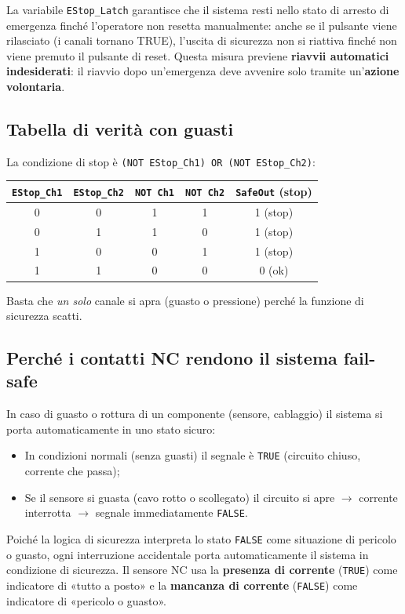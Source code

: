 La variabile \texttt{EStop\_Latch} garantisce che il sistema resti nello stato di arresto di emergenza finché l'operatore non resetta manualmente: anche se il pulsante viene rilasciato (i canali tornano TRUE), l'uscita di sicurezza non si riattiva finché non viene premuto il pulsante di reset. Questa misura previene \textbf{riavvii automatici indesiderati}: il riavvio dopo un'emergenza deve avvenire solo tramite un'\textbf{azione volontaria}.

\subsection{Tabella di verità con guasti}
La condizione di stop è \texttt{(NOT EStop\_Ch1) OR (NOT EStop\_Ch2)}:
\begin{center}
\begin{tabular}{cc|cc|c}
\texttt{EStop\_Ch1} & \texttt{EStop\_Ch2} & \texttt{NOT Ch1} & \texttt{NOT Ch2} & \texttt{SafeOut} (stop)\\
\hline
0 & 0 & 1 & 1 & 1 (stop)\\
0 & 1 & 1 & 0 & 1 (stop)\\
1 & 0 & 0 & 1 & 1 (stop)\\
1 & 1 & 0 & 0 & 0 (ok)\\
\end{tabular}
\end{center}
Basta che \emph{un solo} canale si apra (guasto o pressione) perché la funzione di sicurezza scatti.

\subsection{Perché i contatti NC rendono il sistema fail-safe}
In caso di guasto o rottura di un componente (sensore, cablaggio) il sistema si porta automaticamente in uno stato sicuro:
\begin{itemize}
    \item[A.] In condizioni normali (senza guasti) il segnale è \texttt{TRUE} (circuito chiuso, corrente che passa);
    \item[B.] Se il sensore si guasta (cavo rotto o scollegato) il circuito si apre $\to$ corrente interrotta $\to$ segnale immediatamente \texttt{FALSE}.
\end{itemize}
Poiché la logica di sicurezza interpreta lo stato \texttt{FALSE} come situazione di pericolo o guasto, ogni interruzione accidentale porta automaticamente il sistema in condizione di sicurezza. Il sensore NC usa la \textbf{presenza di corrente} (\texttt{TRUE}) come indicatore di «tutto a posto» e la \textbf{mancanza di corrente} (\texttt{FALSE}) come indicatore di «pericolo o guasto».

